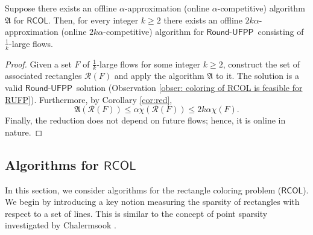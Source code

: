 \documentclass[a4paper,UKenglish]{lipics-v2016}
\newcommand{\rufpp}{\mbox{$\mathsf{Round}$-$\mathsf{UFPP}$}}
\newcommand{\rcol}{\mbox{$\mathsf{RCOL}$}}
\theoremstyle{plain}
\newcommand{\cR}{\mathcal{R}}
\begin{document}
\begin{lemma}\label{lem:reduction}
Suppose there exists an offline $\alpha$-approximation (online $\alpha$-competitive) algorithm $\mathfrak{A}$ for \rcol. Then, for every integer $k\geq 2$ there exists an offline $2k\alpha$-approximation (online $2k\alpha$-competitive) algorithm for \rufpp\ consisting of $\frac{1}{k}$-large flows. 
\end{lemma}
\begin{proof}
Given a set $F$ of $\frac{1}{k}$-large flows for some integer $k\geq 2$, construct the set of associated rectangles $\cR(F)$ and apply the algorithm $\mathfrak{A}$ to it. The solution is a valid \rufpp\ solution (Observation \ref{obser: coloring of RCOL is feasible for RUFP}). Furthermore, by Corollary \ref{cor:red},
\[ \mathfrak{A}(\cR(F)) \leq \alpha \chi(\cR(F)) \leq 2k\alpha \chi(F). \]
Finally, the reduction does not depend on future flows; hence, it is online in nature.
\end{proof}

%
%


\subsection{Algorithms for \rcol}
\label{subsec: Algorithms for rectangle coloring problem}

In this section, we consider algorithms for the rectangle coloring problem (\rcol). We begin by introducing a key notion measuring the sparsity of rectangles with respect to a set of lines. This is similar to the concept of point sparsity investigated by Chalermsook \cite{Chalermsook2011}.
\end{document}
